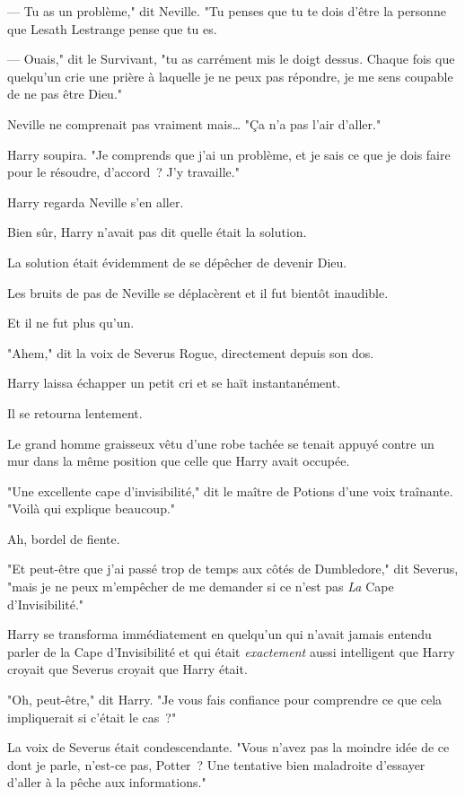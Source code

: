 --- Tu as un problème," dit Neville. "Tu penses que tu te dois d'être la personne que Lesath Lestrange pense que tu es.

--- Ouais," dit le Survivant, "tu as carrément mis le doigt dessus. Chaque fois que quelqu'un crie une prière à laquelle je ne peux pas répondre, je me sens coupable de ne pas être Dieu."

Neville ne comprenait pas vraiment mais… "Ça n'a pas l'air d'aller."

Harry soupira. "Je comprends que j'ai un problème, et je sais ce que je dois faire pour le résoudre, d'accord~? J'y travaille."

\later

Harry regarda Neville s'en aller.

Bien sûr, Harry n'avait pas dit quelle était la solution.

La solution était évidemment de se dépêcher de devenir Dieu.

Les bruits de pas de Neville se déplacèrent et il fut bientôt inaudible.

Et il ne fut plus qu'un.

"Ahem," dit la voix de Severus Rogue, directement depuis son dos.

Harry laissa échapper un petit cri et se haït instantanément.

Il se retourna lentement.

Le grand homme graisseux vêtu d’une robe tachée se tenait appuyé contre un mur dans la même position que celle que Harry avait occupée.

"Une excellente cape d'invisibilité," dit le maître de Potions d'une voix traînante. "Voilà qui explique beaucoup."

Ah, bordel de fiente.

"Et peut-être que j'ai passé trop de temps aux côtés de Dumbledore," dit Severus, "mais je ne peux m'empêcher de me demander si ce n'est pas \emph{La} Cape d'Invisibilité."

Harry se transforma immédiatement en quelqu'un qui n'avait jamais entendu parler de la Cape d'Invisibilité et qui était \emph{exactement} aussi intelligent que Harry croyait que Severus croyait que Harry était.

"Oh, peut-être," dit Harry. "Je vous fais confiance pour comprendre ce que cela impliquerait si c'était le cas~?"

La voix de Severus était condescendante. "Vous n'avez pas la moindre idée de ce dont je parle, n'est-ce pas, Potter~? Une tentative bien maladroite d'essayer d'aller à la pêche aux informations."

